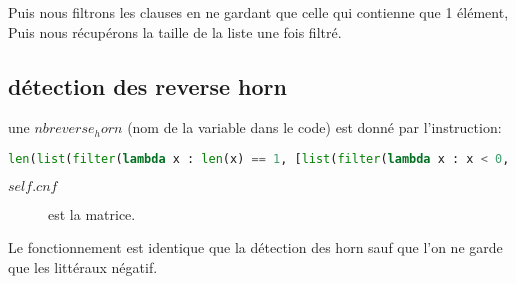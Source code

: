 \documentclass[french, 12pt]{report}
\begin{document}
Puis nous filtrons les clauses en ne gardant que celle qui contienne que 1 élément, Puis nous récupérons la taille de la liste une fois filtré.\\

\subsection{détection des reverse horn}
une $nbreverse_horn$ (nom de la variable dans le code) est donné par l'instruction:

\begin{center}
\lstset{style=mlpythoncode}
\begin{lstlisting}[language=Python]
len(list(filter(lambda x : len(x) == 1, [list(filter(lambda x : x < 0, sl)) for sl in self.cnf])))
\end{lstlisting}
\end{center}

\begin{description}
\item[$self.cnf$] est la matrice.
\end{description}

Le fonctionnement est identique que la détection des horn sauf que l'on ne garde que les littéraux négatif.
\end{document}
